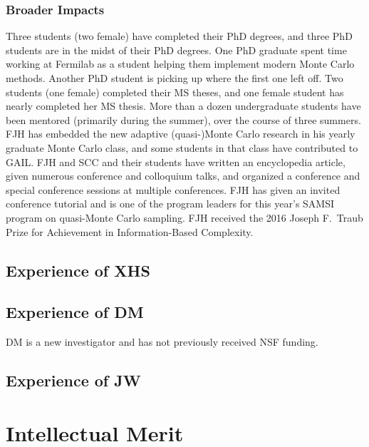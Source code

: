 \documentclass[11pt]{NSFamsart}
\begin{document}
\subsubsection{Broader Impacts}  Three students (two female) have completed their PhD degrees, and three PhD students are in the midst of their PhD degrees.  One PhD graduate spent time working at Fermilab as a student helping them implement modern Monte Carlo methods.  Another PhD student is picking up where the first one left off.  Two students (one female) completed their MS theses, and one female student has nearly completed her MS thesis. More than a dozen undergraduate students have been mentored (primarily during the summer),  over the course of three summers.  FJH has embedded the new adaptive (quasi-)Monte Carlo research in his yearly graduate Monte Carlo class, and some students in that class have contributed to GAIL.  FJH and SCC and their students have written an encyclopedia article, given numerous conference and colloquium talks, and organized a conference and special conference sessions at multiple conferences.  FJH has given an invited conference tutorial and is one of the program leaders for this year's SAMSI program on quasi-Monte Carlo sampling.  FJH received the 2016 Joseph F.\ Traub Prize for Achievement in Information-Based Complexity.






\subsection{Experience of XHS}

\subsection{Experience of DM}

DM is a new investigator and has not previously received NSF funding.


\subsection{Experience of JW}



\section{Intellectual Merit}
\end{document}

